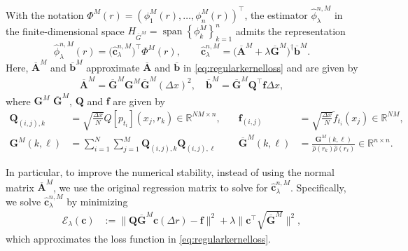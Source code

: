 \documentclass[12pt]{article}
\def\Gbar{ {\overline{G}} }
\def\Abar{ {\overline{A}} }
\def\bbar{ {\overline{b}} }
\numberwithin{equation}{section}
\numberwithin{theorem}{section}
\begin{document}
 With the notation $\Phi^M(r)=\left(\phi_1^M(r), \ldots, \phi_n^M(r)\right)^{\top}$, the estimator $\hat{\phi}_\lambda^{n, M}$ in the finite-dimensional space $H_{\Gbar^M}= \operatorname{span}\left\{\phi_k^M\right\}_{k=1}^n $ admits the representation 
 \begin{equation}
\label{eq:defphiMma}  
\hat\phi_\lambda^{n,M}(r)
= \bigl(\hat{\mathbf{c}}_\lambda^{n,M}\bigr)^\top \Phi^M(r),\qquad
\hat{\mathbf{c}}_\lambda^{n,M}
= \bigl(\mathbf{\Abar}^M + \lambda \mathbf{\Gbar}^M\bigr)^{\dagger}\mathbf{\bbar} ^M.  
\end{equation} 
 Here, $\mathbf{\Abar}^M$ and $\mathbf{\bbar} ^M$ approximate $\mathbf{\Abar}$ and $\mathbf{\bbar}$ in \eqref{eq:regularkernelloss} and are given by 
\begin{equation}
\label{eq:matrix}
\begin{aligned}
 \mathbf{\Abar}^M =\mathbf{\Gbar}^M\mathbf{G}^M\mathbf{\Gbar}^M (\Delta x)^2, \quad \mathbf{\bbar} ^M = \mathbf{\Gbar}^M\mathbf{Q}^\top \mathbf{f}\Delta x, 
\end{aligned}
\end{equation}
where $\mathbf{G}^M$ %
$\mathbf{\Gbar}^M$, $\mathbf{Q}$ and $\mathbf{f}$ are given by  
\begin{equation}
\label{eq:matrixexpression}
\begin{aligned}
\mathbf{Q}_{(i, j), k} & =
\sqrt{\frac{\Delta x}{N}}Q\left[p_{t_i}\right]\left(x_j, r_k\right) \in \mathbb{R}^{N M \times n}, \quad
&\mathbf{f}_{(i, j)} & =\sqrt{\frac{\Delta x}{N}} \tilde{f}_{t_i}\left(x_j\right) \in \mathbb{R}^{N M},\\
\mathbf{G}^M(k, \ell) & =\sum_{i=1}^N \sum_{j=1}^M  \mathbf{Q}_{(i, j), k} \mathbf{Q}_{(i, j), \ell}
& \mathbf{\Gbar}^M(k, \ell) &= \frac{\mathbf{G}^M(k, \ell)}{\widehat{\rho}(r_k)\widehat{\rho}(r_\ell)} \in \mathbb{R}^{n \times n}.
\end{aligned}
\end{equation}


In particular, to improve the numerical stability,  instead of using the normal matrix $\overline{\mathbf{A}}^M$, we use the original regression matrix to solve for $\hat{\mathbf{c}}_\lambda^{n, M}$. Specifically, we solve $\hat{\mathbf{c}}_\lambda^{n, M}$ by minimizing 
\begin{equation}
\label{eq:discreteloss}
\begin{aligned}
 \mathcal{E}_\lambda(\mathbf{c})&:=\| \mathbf{Q}\mathbf{\Gbar}^M\mathbf{c} (\Delta r) - \mathbf{f}\|^2+ \lambda\| \mathbf{c}^\top  \sqrt{\mathbf{\Gbar}^M}\|^2, 
\end{aligned}
\end{equation}
which approximates the loss function in \eqref{eq:regularkernelloss}. 
\end{document}
